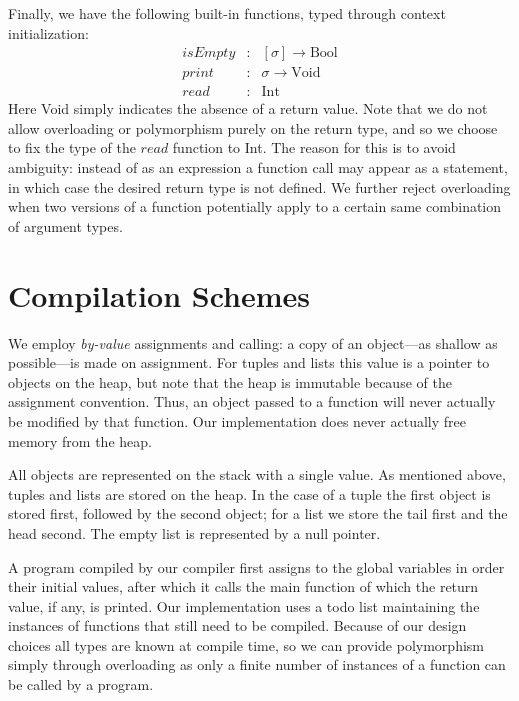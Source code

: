 \documentclass[a4paper]{article}
\begin{document}
Finally, we have the following built-in functions, typed through context initialization:
\[
    \begin{array}{lcl}
        \mathit{isEmpty} & : & [\sigma] \to \text{Bool} \\
        \mathit{print}   & : & \sigma \to \text{Void} \\
        \mathit{read}    & : & \text{Int}
    \end{array}
\]
Here Void simply indicates the absence of a return value.
Note that we do not allow overloading or polymorphism purely on the return type, and so we choose to fix the type of the $\mathit{read}$ function to Int.
The reason for this is to avoid ambiguity: instead of as an expression a function call may appear as a statement, in which case the desired return type is not defined.
We further reject overloading when two versions of a function potentially apply to a certain same combination of argument types.

\section{Compilation Schemes}

We employ \emph{by-value} assignments and calling: a copy of an object---as shallow as possible---is made on assignment.
For tuples and lists this value is a pointer to objects on the heap, but note that the heap is immutable because of the assignment convention.
Thus, an object passed to a function will never actually be modified by that function.
Our implementation does never actually free memory from the heap. %

All objects are represented on the stack with a single value.
As mentioned above, tuples and lists are stored on the heap.
In the case of a tuple the first object is stored first, followed by the second object; for a list we store the tail first and the head second.
The empty list is represented by a null pointer.

A program compiled by our compiler first assigns to the global variables in order their initial values, after which it calls the main function of which the return value, if any, is printed.
Our implementation uses a todo list maintaining the instances of functions that still need to be compiled.
Because of our design choices all types are known at compile time, so we can provide polymorphism simply through overloading as only a finite number of instances of a function can be called by a program.
\end{document}
